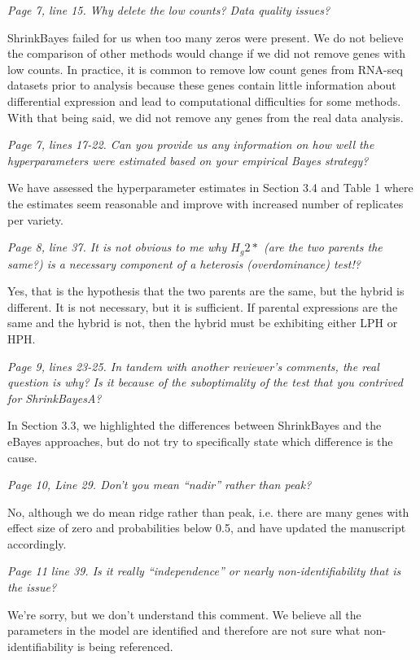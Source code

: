 \documentclass{article}
\newcommand{\comment}[1]{\textit{#1}}
\newcommand{\response}[1]{#1}
\begin{document}
\comment{Page 7, line 15.  Why delete the low counts?  Data quality issues?}

\response{ShrinkBayes failed for us when too many zeros were present. We do not believe the comparison of other methods would change if we did not remove genes with low counts.  In practice, it is common to remove low count genes from RNA-seq datasets prior to analysis because these genes contain little information about differential expression and lead to computational difficulties for some methods. With that being said, we did not remove any genes from the real data analysis.}

\comment{Page 7, lines 17-22.  Can you provide us any information on how well the hyperparameters were estimated based on your empirical Bayes strategy?}

\response{We have assessed the hyperparameter estimates in Section 3.4 and Table 1 where the estimates seem reasonable and improve with increased number of replicates per variety.}

\comment{Page 8, line 37.  It is not obvious to me why $H_g2*$ (are the two parents the same?) is a necessary component of a heterosis (overdominance) test!?}

\response{Yes, that is the hypothesis that the two parents are the same, but the hybrid is different. It is not necessary, but it is sufficient. If parental expressions are the same and the hybrid is not, then the hybrid must be exhibiting either LPH or HPH.}

\comment{Page 9, lines 23-25.  In tandem with another reviewer’s comments, the real question is why?  Is it because of the suboptimality of the test that you contrived for ShrinkBayesA?}

\response{In Section 3.3, we highlighted the differences between ShrinkBayes and the eBayes approaches, but do not try to specifically state which difference is the cause.}

\comment{Page 10, Line 29.  Don’t you mean “nadir” rather than peak?}

\response{No, although we do mean ridge rather than peak, i.e. there are many genes with effect size of zero and probabilities below 0.5, and have updated the manuscript accordingly.}

\comment{Page 11 line 39.  Is it really “independence” or nearly non-identifiability that is the issue?}

\response{We're sorry, but we don't understand this comment. We believe all the parameters in the model are identified and therefore are not sure what non-identifiability is being referenced.}
\end{document}

